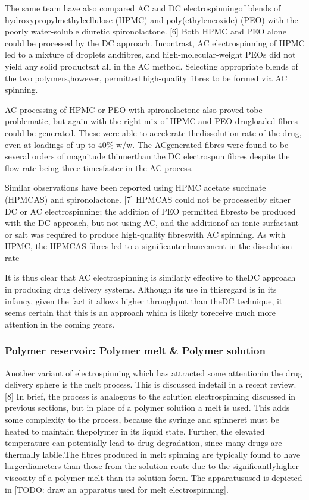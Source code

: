 \documentclass[5p,,preprint,12pt,twocolumn]{elsarticle}
\begin{document}
The same team have also compared AC and DC electrospinningof blends of hydroxypropylmethylcellulose (HPMC) and poly(ethyleneoxide) (PEO) with the poorly water-soluble diuretic spironolactone. [6] Both HPMC and PEO alone could be processed by the DC approach. Incontrast, AC electrospinning of HPMC led to a mixture of droplets andfibres, and high-molecular-weight PEOs did not yield any solid productsat all in the AC method. Selecting appropriate blends of the two polymers,however, permitted high-quality fibres to be formed via AC spinning.

AC processing of HPMC or PEO with spironolactone also proved tobe problematic, but again with the right mix of HPMC and PEO drugloaded fibres could be generated. These were able to accelerate thedissolution rate of the drug, even at loadings of up to 40\% w/w. The ACgenerated fibres were found to be several orders of magnitude thinnerthan the DC electrospun fibres despite the flow rate being three timesfaster in the AC process.

Similar observations have been reported using HPMC acetate succinate (HPMCAS) and spironolactone. [7] HPMCAS could not be processedby either DC or AC electrospinning; the addition of PEO permitted fibresto be produced with the DC approach, but not using AC, and the additionof an ionic surfactant or salt was required to produce high-quality fibreswith AC spinning. As with HPMC, the HPMCAS fibres led to a significantenhancement in the dissolution rate

It is thus clear that AC electrospinning is similarly effective to theDC approach in producing drug delivery systems. Although its use in thisregard is in its infancy, given the fact it allows higher throughput than theDC technique, it seems certain that this is an approach which is likely toreceive much more attention in the coming years.



\subsubsection{Polymer reservoir: Polymer melt \& Polymer solution}Another variant of electrospinning which has attracted some attentionin the drug delivery sphere is the melt process. This is discussed indetail in a recent review. [8] In brief, the process is analogous to the solution electrospinning discussed in previous sections, but in place of a polymer solution a melt is used. This adds some complexity to the process, because the syringe and spinneret must be heated to maintain thepolymer in its liquid state. Further, the elevated temperature can potentially lead to drug degradation, since many drugs are thermally labile.The fibres produced in melt spinning are typically found to have largerdiameters than those from the solution route due to the significantlyhigher viscosity of a polymer melt than its solution form. The apparatusused is depicted in [TODO: draw an apparatus used for melt electrospinning].
\end{document}
